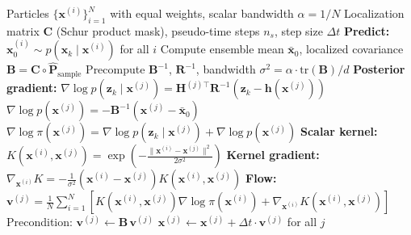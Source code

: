 \documentclass{article}
\begin{document}
\begin{algorithm}[H]
\caption{Kernel Flow Filter --- Scalar Kernel}
\begin{algorithmic}[1]
\REQUIRE Particles $\{\mathbf{x}^{(i)}\}_{i=1}^{N}$ with equal weights, scalar bandwidth $\alpha = 1/N$
\REQUIRE Localization matrix $\mathbf{C}$ (Schur product mask), pseudo-time steps $n_s$, step size $\Delta t$
  \STATE \textbf{Predict:} $\mathbf{x}_0^{(i)} \sim p(\mathbf{x}_k \mid \mathbf{x}^{(i)})$ for all $i$
  \STATE Compute ensemble mean $\bar{\mathbf{x}}_0$, localized covariance $\mathbf{B} = \mathbf{C} \circ \hat{\mathbf{P}}_{\text{sample}}$
  \STATE Precompute $\mathbf{B}^{-1}$, $\mathbf{R}^{-1}$, bandwidth $\sigma^2 = \alpha \cdot \text{tr}(\mathbf{B})/d$
      \STATE \textbf{Posterior gradient:}
      \STATE $\nabla \log p(\mathbf{z}_k \mid \mathbf{x}^{(j)}) = \mathbf{H}^{(j)\top}\mathbf{R}^{-1}(\mathbf{z}_k - \mathbf{h}(\mathbf{x}^{(j)}))$
      \STATE $\nabla \log p(\mathbf{x}^{(j)}) = -\mathbf{B}^{-1}(\mathbf{x}^{(j)} - \bar{\mathbf{x}}_0)$
      \STATE $\nabla \log \pi(\mathbf{x}^{(j)}) = \nabla \log p(\mathbf{z}_k \mid \mathbf{x}^{(j)}) + \nabla \log p(\mathbf{x}^{(j)})$
      \STATE \textbf{Scalar kernel:} $K(\mathbf{x}^{(i)}, \mathbf{x}^{(j)}) = \exp\!\left(-\frac{\|\mathbf{x}^{(i)}-\mathbf{x}^{(j)}\|^2}{2\sigma^2}\right)$
      \STATE \textbf{Kernel gradient:} $\nabla_{\mathbf{x}^{(i)}} K = -\frac{1}{\sigma^2}(\mathbf{x}^{(i)}-\mathbf{x}^{(j)}) K(\mathbf{x}^{(i)}, \mathbf{x}^{(j)})$
      \STATE \textbf{Flow:} $\mathbf{v}^{(j)} = \frac{1}{N}\sum_{i=1}^{N}\left[K(\mathbf{x}^{(i)}, \mathbf{x}^{(j)})\nabla \log\pi(\mathbf{x}^{(i)}) + \nabla_{\mathbf{x}^{(i)}}K(\mathbf{x}^{(i)}, \mathbf{x}^{(j)})\right]$
    \ENDFOR
    \STATE Precondition: $\mathbf{v}^{(j)} \leftarrow \mathbf{B}\, \mathbf{v}^{(j)}$
    \STATE $\mathbf{x}^{(j)} \leftarrow \mathbf{x}^{(j)} + \Delta t \cdot \mathbf{v}^{(j)}$ for all $j$
  \ENDFOR
\ENDFOR
\end{algorithmic}
\end{algorithm}
\end{document}
